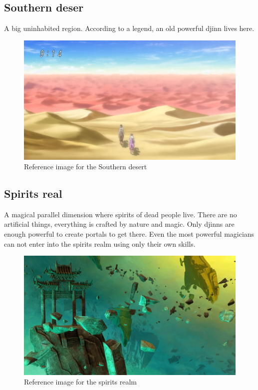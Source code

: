 \subsection{Southern deser}
	A big uninhabited region. According to a legend, an old powerful djinn lives here.
	\begin{figure}[H]
	  \centering
	  \includegraphics[width=12cm]{../Images/Locations/southernDesert}
	  \caption{Reference image for the Southern desert}
	\end{figure}

\subsection{Spirits real}
	A magical parallel dimension where spirits of dead people live. There are no artificial things, everything is crafted by nature and magic. Only djinns are enough powerful to create portals to get there. Even the most powerful magicians can not enter into the spirits realm using only their own skills.
	\begin{figure}[H]
	  \centering
	  \includegraphics[width=12cm]{../Images/Locations/spiritsRealm}
	  \caption{Reference image for the spirits realm}
	\end{figure}

